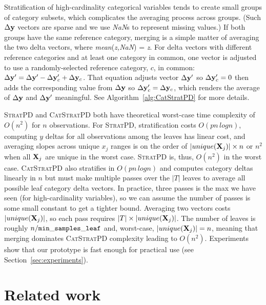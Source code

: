 \documentclass[]{article} %
\newcommand{\secref}[1]{Section~\ref{#1}}
\newcommand{\algref}[1]{Algorithm~\ref{#1}}
\newcommand{\spd}{\fontfamily{cmr}\textsc{\small StratPD}}
\newcommand{\cspd}{\fontfamily{cmr}\textsc{\small CatStratPD}}
\begin{document}
Stratification of high-cardinality categorical variables tends to create small groups of category subsets, which complicates the averaging process across groups. (Such $\Delta {\bf y}$ vectors are sparse and we use {\it NaN}s to represent missing values.) If both groups have the same reference category, merging is a simple matter of averaging the two delta vectors, where {\it mean}({\it z,NaN}) = {\it z}.  For delta vectors with different reference categories and at least one category in common, one vector is adjusted to use a randomly-selected reference category, $c$, in common: $\Delta {\bf y}' = \Delta {\bf y}' - \Delta {\bf y}_c' + \Delta {\bf y}_c$. That equation adjusts vector $\Delta {\bf y}'$ so $\Delta {\bf y}_c'=0$ then adds the corresponding value from $\Delta {\bf y}$ so $\Delta {\bf y}_c' = \Delta {\bf y}_c$, which renders the average of $\Delta {\bf y}$ and $\Delta {\bf y}'$ meaningful.  See \algref{alg:CatStratPD} for more details.

\spd{} and \cspd{} both have theoretical worst-case time complexity of $O(n^2)$ for $n$ observations. For \spd{}, stratification costs $O(p n \,log n)$, computing $y$ deltas for all observations among the leaves has linear cost, and averaging slopes across unique $x_j$ ranges is on the order of $|unique({\bf X}_j)| \times n$ or $n^2$ when all ${\bf X}_j$ are unique in the worst case. \spd{} is, thus, $O(n^2)$ in the worst case.  \cspd{} also stratifies in $O(p n \,log n)$ and computes category deltas linearly in $n$ but must make multiple passes over the $|T|$ leaves to average all possible leaf category delta vectors.  In practice, three passes is the max we have seen (for high-cardinality variables), so we can assume the number of passes is some small constant to get a tighter bound. Averaging two vectors costs $|unique({\bf X}_j)|$, so each pass requires $|T| \times |unique({\bf X}_j)|$. The number of leaves is roughly $n / {\tt\small min\_samples\_leaf}$ and, worst-case, $|unique({\bf X}_j)|=n$, meaning that merging dominates \cspd{} complexity leading to $O(n^2)$.  Experiments show that our prototype is fast enough for practical use (see \secref{sec:experiments}).

\section{Related work}\label{sec:related}
\end{document}
